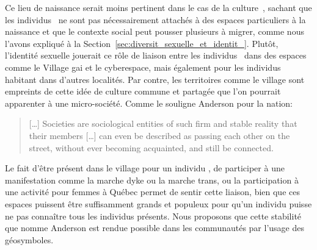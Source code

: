 Ce lieu de naissance serait moins pertinent dans le cas de la culture~\lgbt{}, sachant que les individus~\lgbt{} ne sont pas nécessairement attachés à des espaces particuliers à la naissance et que le contexte social peut pousser plusieurs à migrer, comme nous l'avons expliqué à la Section~\ref{sec:diversit_sexuelle_et_identit_}.
Plutôt, l'identité sexuelle jouerait ce rôle de liaison entre les individus~\lgbt{} dans des espaces comme le Village gai et le cyberespace, mais également pour les individus habitant dans d'autres localités.
Par contre, les territoires comme le village sont empreints de cette idée de culture commune et partagée que l'on pourrait apparenter à une micro-société.
Comme le souligne Anderson pour la nation:
\begin{quote}
  [\ldots] Societies are sociological entities of such firm and stable reality that their members [\ldots] can even be described as passing each other on the street, without ever becoming acquainted, and still be connected.~\citep[25]{Anderson2006}
\end{quote}
Le fait d'être présent dans le village pour un individu \lgbt{}, de participer à une manifestation comme la marche dyke ou la marche trans, ou la participation à une activité pour femmes à Québec permet de sentir cette liaison, bien que ces espaces puissent être suffisamment grands et populeux pour qu'un individu puisse ne pas connaître tous les individus présents.
Nous proposons que cette stabilité que nomme Anderson est rendue possible dans les communautés \lgbt{} par l'usage des géosymboles.


